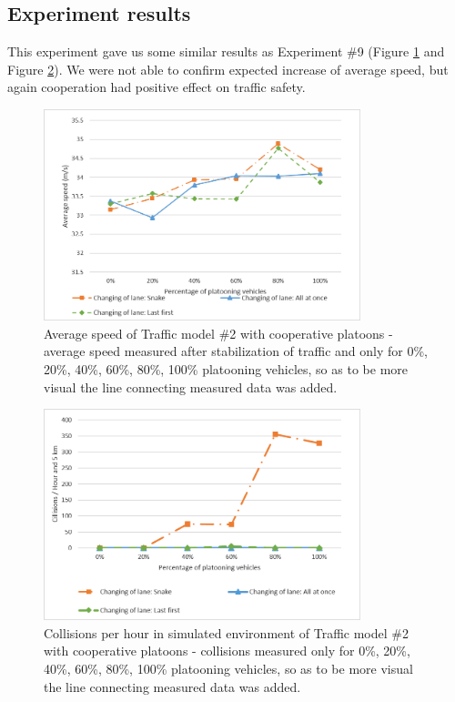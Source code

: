 \subsection*{Experiment results}

This experiment gave us some similar results as Experiment \#9 (Figure \ref{fig:6_5_2-1} and Figure \ref{fig:6_5_2-2}). We were not able to confirm expected increase of average speed, but again cooperation had positive effect on traffic safety.


\begin{figure}[ph]
\centering
\includegraphics[width=0.82\textwidth,height=0.82\textheight,keepaspectratio]{figures/Chapter_6/6_E4_avgSpeed.png}
\centering
\protect\caption[Average speed of Traffic model \#2 with cooperative platoons]{\label{fig:6_5_2-1}Average speed of Traffic model \#2 with cooperative platoons - average speed measured after stabilization of traffic and only for 0\%, 20\%, 40\%, 60\%, 80\%, 100\% platooning vehicles, so as to be more visual the line connecting measured data was added.}
\end{figure}

\begin{figure}[ph]
\centering
\includegraphics[width=0.82\textwidth,height=0.82\textheight,keepaspectratio]{figures/Chapter_6/6_E4_collision.png}
\centering
\protect\caption[Collisions per hour in simulated environment  of Traffic model \#2 with cooperative platoons]{\label{fig:6_5_2-2}Collisions per hour in simulated environment  of Traffic model \#2 with cooperative platoons - collisions measured only for 0\%, 20\%, 40\%, 60\%, 80\%, 100\% platooning vehicles, so as to be more visual the line connecting measured data was added.}
\end{figure}
